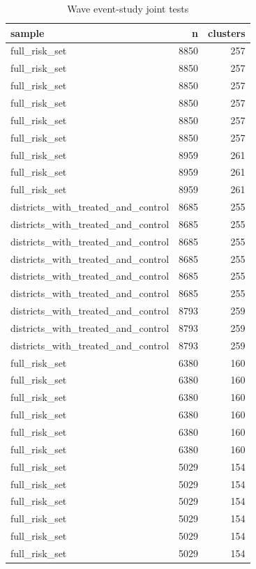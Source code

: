 \begin{table}[!htbp] \centering
\caption{Wave event-study joint tests}
\begin{tabular}{lrr}
\toprule
sample & n & clusters \\
\midrule
full\_risk\_set & 8850 & 257 \\
full\_risk\_set & 8850 & 257 \\
full\_risk\_set & 8850 & 257 \\
full\_risk\_set & 8850 & 257 \\
full\_risk\_set & 8850 & 257 \\
full\_risk\_set & 8850 & 257 \\
full\_risk\_set & 8959 & 261 \\
full\_risk\_set & 8959 & 261 \\
full\_risk\_set & 8959 & 261 \\
districts\_with\_treated\_and\_control & 8685 & 255 \\
districts\_with\_treated\_and\_control & 8685 & 255 \\
districts\_with\_treated\_and\_control & 8685 & 255 \\
districts\_with\_treated\_and\_control & 8685 & 255 \\
districts\_with\_treated\_and\_control & 8685 & 255 \\
districts\_with\_treated\_and\_control & 8685 & 255 \\
districts\_with\_treated\_and\_control & 8793 & 259 \\
districts\_with\_treated\_and\_control & 8793 & 259 \\
districts\_with\_treated\_and\_control & 8793 & 259 \\
full\_risk\_set & 6380 & 160 \\
full\_risk\_set & 6380 & 160 \\
full\_risk\_set & 6380 & 160 \\
full\_risk\_set & 6380 & 160 \\
full\_risk\_set & 6380 & 160 \\
full\_risk\_set & 6380 & 160 \\
full\_risk\_set & 5029 & 154 \\
full\_risk\_set & 5029 & 154 \\
full\_risk\_set & 5029 & 154 \\
full\_risk\_set & 5029 & 154 \\
full\_risk\_set & 5029 & 154 \\
full\_risk\_set & 5029 & 154 \\

\end{tabular}
\end{table}
